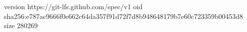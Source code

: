 version https://git-lfs.github.com/spec/v1
oid sha256:e787ac9666f0e662c64da357f91d72f7d8b948648179b7e60c723359b00453d8
size 280269
